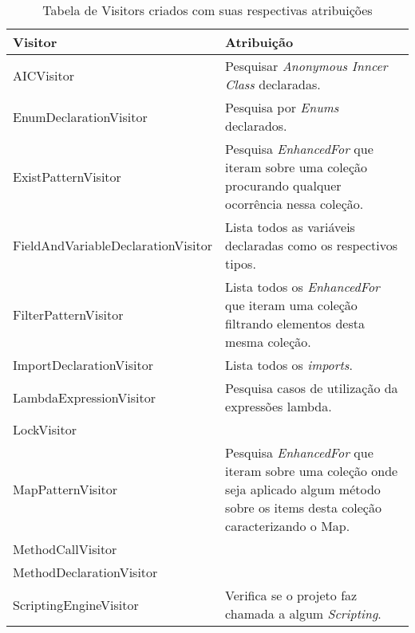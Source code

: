\begin{table}[ht!] \footnotesize
	\centering
	\caption{Tabela de Visitors criados com suas respectivas atribuições}
	\label{tab:VisitorsCriados}	
    \begin{tabular}{ >{\arraybackslash}p{2.2in} | >{\arraybackslash}m{3.8in} }
			\hline 
			\textbf{Visitor} & \textbf{Atribuição}\\ \hline \hline
			
			AICVisitor & Pesquisar \textit{Anonymous Inncer Class} declaradas.\\ \hline
			
			EnumDeclarationVisitor 	& Pesquisa por \textit{Enums} declarados.\\ \hline
			
			ExistPatternVisitor	& Pesquisa \textit{EnhancedFor} que iteram sobre uma coleção procurando qualquer ocorrência nessa coleção.\\ \hline
			
			FieldAndVariableDeclarationVisitor & Lista todos as variáveis declaradas como os respectivos tipos.\\ \hline
			
			FilterPatternVisitor &  Lista todos os \textit{EnhancedFor} que iteram uma coleção filtrando elementos desta mesma coleção.\\ \hline
			
			ImportDeclarationVisitor & Lista todos os \textit{imports}.\\ \hline
			
			LambdaExpressionVisitor & Pesquisa casos de utilização da expressões lambda. \\ \hline
			
			LockVisitor & \\ \hline
			
			MapPatternVisitor & Pesquisa \textit{EnhancedFor} que iteram sobre uma coleção onde seja aplicado algum método sobre os items desta coleção caracterizando o Map. \\ \hline
			
			MethodCallVisitor & \\ \hline
			
			MethodDeclarationVisitor & \\ \hline
			
			ScriptingEngineVisitor & Verifica se o projeto faz chamada a algum \textit{Scripting}.\\ \hline
			

\end{tabular}
\end{table}

